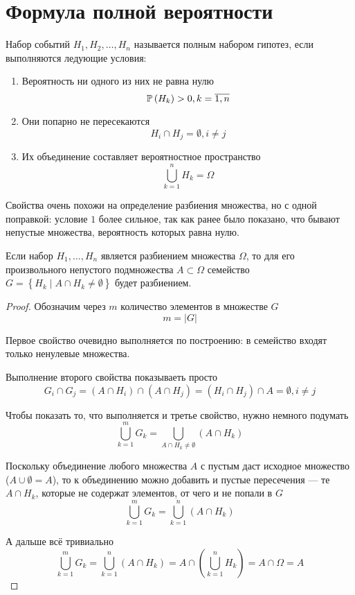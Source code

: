 \section{Формула полной вероятности}
\begin{definition}
    Набор событий $H_1, H_2, \dots, H_n$ называется полным набором гипотез,
    если выполняются ледующие условия:
    \begin{enumerate}
        \item Вероятность ни одного из них не равна нулю
            $$\mathbb{P}\left( H_k \right)>0, k=\overline{1,n}$$
        \item Они попарно не пересекаются
            $$H_i\cap H_j=\emptyset, i\neq j$$
        \item Их объединение составляет вероятностное пространство
            $$\bigcup_{k=1}^n H_k=\Omega$$
    \end{enumerate}
    Свойства очень похожи на определение разбиения множества,
    но с одной поправкой: условие $1$ более сильное, так как ранее
    было показано, что бывают непустые множества, вероятность которых
    равна нулю.
\end{definition}
\begin{lemma}
    Если набор $H_1, \dots, H_n$ является разбиением множества $\Omega$,
    то для его произвольного непустого подмножества $A\subset\Omega$
    семейство $G=\left\{H_k\mid A\cap H_k\neq \emptyset\right\}$
    будет разбиением.
\end{lemma}
\begin{proof}
    Обозначим через $m$ количество элементов в множестве $G$
    $$m=\left|G\right|$$

    Первое свойство очевидно выполняется по построению:
    в семейство входят только ненулевые множества.

    Выполнение второго свойства показываеть просто
    $$G_i\cap G_j = \left(A\cap H_i\right)\cap \left(A\cap H_j\right)
    =\left(H_i\cap H_j\right)\cap A=\emptyset, i\neq j$$

    Чтобы показать то, что выполняется и третье свойство,
    нужно немного подумать
    $$\bigcup_{k=1}^m G_k
    =\bigcup_{A\cap H_k\neq\emptyset} \left(A\cap H_k\right)$$

    Поскольку объединение любого множества $A$ с пустым даст исходное
    множество ($A\cup \emptyset=A$), то к объединению можно добавить
    и пустые пересечения --- те $A\cap H_k$, которые не содержат элементов,
    от чего и не попали в $G$
    $$\bigcup_{k=1}^m G_k=\bigcup_{k=1}^n \left(A\cap H_k\right)$$

    А дальше всё тривиально
    $$\bigcup_{k=1}^m G_k=\bigcup_{k=1}^n \left(A\cap H_k\right)
    =A\cap\left(\bigcup_{k=1}^n H_k\right)=A\cap\Omega=A$$
\end{proof}
